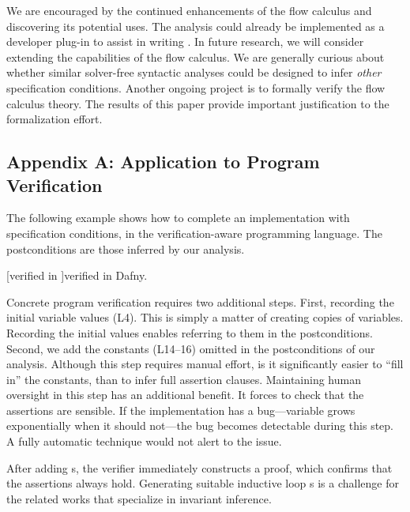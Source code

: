 We are encouraged by the continued enhancements of the flow calculus and discovering its potential uses.
The analysis could already be implemented as a developer plug-in to assist in writing .
In future research, we will consider extending the capabilities of the flow calculus.
We are generally curious about whether similar solver-free syntactic analyses could be designed to infer \emph{other} specification conditions. %
Another ongoing project is to formally verify the flow calculus theory.
The results of this paper provide important justification to the formalization effort.

\clearpage

\subsection{Appendix A: Application to Program Verification}
\label{app:sec:verified}

The following example shows how to complete an implementation with specification
conditions, in the verification-aware  programming language. The
postconditions are those inferred by our analysis.

\begin{center}
\begin{minipage}{\textwidth}
\captionsetup{type=lstlisting}
[\exname verified in ]{\exname verified in Dafny.}
\label{lst:dafny-ex}
\end{minipage}
\end{center}

Concrete program verification requires two additional steps. First, recording
the initial variable values (L4). This is simply a matter of creating copies of
variables. Recording the initial values enables referring to them in the
postconditions. Second, we add the constants (L14--16) omitted in the
postconditions of our analysis. Although this step requires manual effort, is it
significantly easier to \enquote{fill in} the constants, than to infer full
assertion clauses. Maintaining human oversight in this step has an additional
benefit. It forces to check that the assertions are sensible. If the
implementation has a bug---\eg variable grows exponentially when it should
not---the bug becomes detectable during this step. A fully automatic technique
would not alert to the issue.

After adding s, the  verifier immediately constructs a proof,
which confirms that the assertions always hold. Generating suitable inductive
loop s is a challenge for the related works that specialize in
invariant inference.

